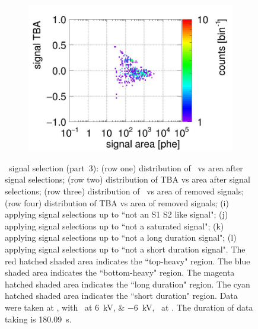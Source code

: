 \begin{landscape}
\begin{figure}[!p]
\begin{subfigure}[t]{0.33\textwidth}
		\includegraphics[width=\figurewidth,clip,trim={0 0 0 40}]{Figures/GasTest/CutsValid/res64767/tbapaX14Vecfig64767.jpg}
		\caption{}
		\label{fig:signal selection 14}
	\end{subfigure}
	\caption[\gtest\ signal selection (part~3).]{\gtest\ signal selection (part~3): 
			(row one) distribution of \rpdshort\ vs area after signal selections;
(row two) distribution of TBA vs area after signal selections;
(row three) distribution of \rpdshort\ vs area of removed signals;
(row four) distribution of TBA vs area of removed signals;
(i) applying signal selections up to ``not an S1 S2 like signal";
(j) applying signal selections up to ``not a saturated signal";
(k) applying signal selections up to ``not a long duration signal";
(l) applying signal selections up to ``not a short duration signal".
The red hatched shaded area indicates the ``top-heavy" region.
The blue shaded area indicates the ``bottom-heavy" region.
The magenta hatched shaded area indicates the ``long duration" region.
The cyan hatched shaded area indicates the ``short duration" region.
		Data were taken at , with \opvtvb\ at \SIlist{+6;-6}{kV}, \opgd\ at \standarddensity . The duration of data taking is \SI{180.09}{\s}.
	}
	\label{fig:signal selection l3}
\end{figure}
\end{landscape}
